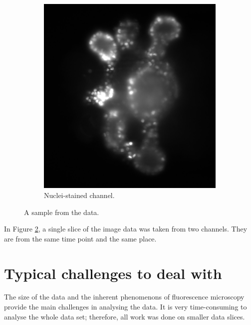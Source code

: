 \documentclass[
  digital,     %
  oneside,     %
  nosansbold,  %
  nocolorbold, %
  lof,         %
  lot,         %
]{fithesis4}
\begin{document}
\begin{figure}
\begin{subfigure}[t]{0.4\textwidth}
        \includegraphics[width=\textwidth]{resources/C2-t006-200-scaled.jpg}
        \caption{Nuclei-stained channel.}
        \label{fig:data_example_nuclei}
    \end{subfigure}
    \caption{A sample from the data.}
    \label{fig:data_example}
\end{figure}
In Figure \ref{fig:data_example}, a single slice of the image data was taken from
two channels. They are from the same time point and the same place.

\section{Typical challenges to deal with}

The size of the data and the inherent phenomenons of fluorescence microscopy
provide the main challenges in analysing the data. It is very time-consuming to
analyse the whole data set; therefore, all work was done on smaller data slices.
\end{document}
